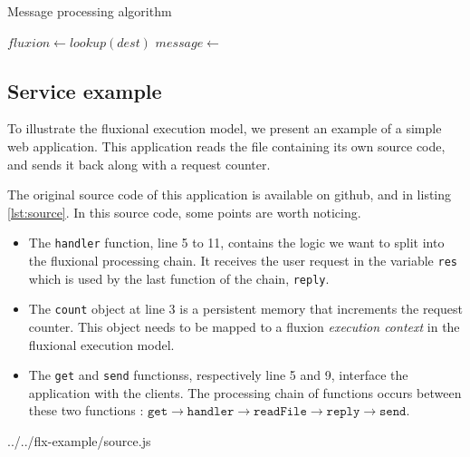 \begin{algorithm}
\caption{Message processing algorithm}
\label{alg:traitement}
\begin{algorithmic}
\State $fluxion \gets lookup(dest)$
\State $message \gets$  
\State {} 
\EndFor
\EndFunction
\end{algorithmic}
\end{algorithm}

\subsection{Service example}

To illustrate the fluxional execution model, we present an example of a simple web application.
This application reads the file containing its own source code, and sends it back along with a request counter.

The original source code of this application is available on github\cite{flx-example}, and in listing \ref{lst:source}.
In this source code, some points are worth noticing.

\begin{itemize}
  \item The \texttt{handler} function, line 5 to 11, contains the logic we want to split into the fluxional processing chain.
  It receives the user request in the variable \texttt{res} which is used by the last function of the chain, \texttt{reply}.
  \item The \texttt{count} object at line 3 is a persistent memory that increments the request counter.
  This object needs to be mapped to a fluxion \textit{execution context} in the fluxional execution model.
  \item The \texttt{get} and \texttt{send} functionss, respectively line 5 and 9, interface the application with the clients.
  The processing chain of functions occurs between these two functions : $\texttt{get} \to \texttt{handler} \to \texttt{readFile} \to \texttt{reply} \to \texttt{send}$.
\end{itemize}

{../../flx-example/source.js}


